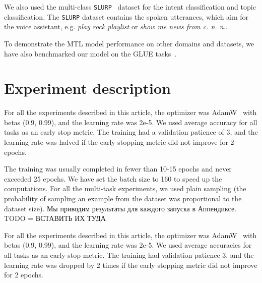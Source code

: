We also used the multi-class \texttt{SLURP}~\cite{slurp} dataset for the intent classification and topic classification. The \texttt{SLURP} dataset contains the spoken utterances, which aim for the voice assistant, e.g. \textit{play rock playlist} or \textit{show me news from c. n. n.}.

To demonstrate the MTL model performance on other domains and datasets, we have also benchmarked our model on the GLUE tasks~\cite{GLUE:19}.
\section {Experiment description}

For all the experiments described in this article, the optimizer was AdamW~\cite{adam} with betas (0.9, 0.99), and the learning rate was 2e-5.%
We used average accuracy for all tasks as an early stop metric. The training had a validation patience of 3, and the learning rate was halved if the early stopping metric did not improve for 2 epochs. 

The training was usually completed in fewer than 10-15 epochs and never exceeded 25 epochs.%
We have set the batch size to 160 to speed up the computations. For all the multi-task experiments, we used plain sampling (the probability of sampling an example from the dataset was proportional to the dataset size). 
Мы приводим результаты для каждого запуска в Аппендиксе. TODO = ВСТАВИТЬ ИХ ТУДА


For all the experiments described in this article, the optimizer was AdamW~\cite{adam} with betas (0.9, 0.99), and the learning rate was 2e-5. 
We used average accuracies for all tasks as an early stop metric. The training had validation patience 3, and the learning rate was dropped by 2 times if the early stopping metric did not improve for 2 epochs. 

